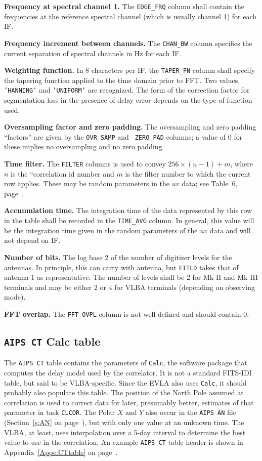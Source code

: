 \documentclass[twoside]{article}
\begin{document}
{\bf Frequency at spectral channel 1.}  The {\tt EDGE\_FRQ} column
shall contain the frequencies at the reference spectral channel (which
is usually channel 1) for each IF\@.

{\bf Frequency increment between channels.}  The {\tt CHAN\_BW} column
specifies the current separation of spectral channels in Hz for each
IF\@.

{\bf Weighting function.}  In 8 characters per IF, the {\tt TAPER\_FN}
column shall specify the tapering function applied to the time domain
prior to FFT\@.  Two values, {\tt 'HANNING'} and {\tt 'UNIFORM'} are
recognized.  The form of the correction factor for segmentation loss
in the presence of delay error depends on the type of function used.

{\bf Oversampling factor and zero padding.} The oversampling and zero
padding ``factors'' are given by the {\tt OVR\_SAMP} and {\tt
  ZERO\_PAD} columns; a value of 0 for these implies no oversampling
and no zero padding.

{\bf Time filter.}  The {\tt FILTER} columns is used to convey
$ 256 \times (n-1) + m$, where $n$ is the ``correlation id number and
$m$ is the filter number to which the current row applies.  These may
be random parameters in the $uv$ data; see Table~6,
page~\pageref{ta:UVcols}.

{\bf Accumulation time.} The integration time of the data represented
by this row in the table shall be recorded in the {\tt TIME\_AVG}
column.  In general, this value will be the integration time given in
the random parameters of the $uv$ data and will not depend on IF\@.

{\bf Number of bits.}  The log base 2 of the number of digitizer
levels for the antennas.  In principle, this can carry with antenna,
but {\tt FITLD} takes that of antenna 1 as representative.  The number
of levels shall be 2 for Mk II and Mk III terminals and may be either
2 or 4 for VLBA terminals (depending on observing mode).

{\bf FFT overlap.}  The {\tt FFT\_OVPL} column is not well defined and
should contain 0.

\vfill\eject
\subsection{{\tt AIPS CT} Calc table}
\label{s:CT}

The {\tt AIPS CT} table contains the parameters of {\tt Calc}, the
software package that computes the delay model used by the correlator.
It is not a standard FITS-IDI table, but said to be VLBA-specific.
Since the EVLA also uses {\tt Calc}, it should probably also populate
this table.  The position of the North Pole assumed at correlation is
used to correct data for later, presumably better, estimates of that
parameter in task {\tt CLCOR}\@.  The Polar $X$ and $Y$ also occur in
the {\tt AIPS AN} file (Section~\ref{s:AN} on page~\pageref{s:AN}),
but with only one value at an unknown time.  The VLBA, at least, uses
interpolation over a 5-day interval to determine the best value to use
in the correlation.  An example {\tt AIPS CT} table header is
shown in Appendix~\ref{Appe:CTtable} on page~\pageref{Appe:CTtable}.
\end{document}
